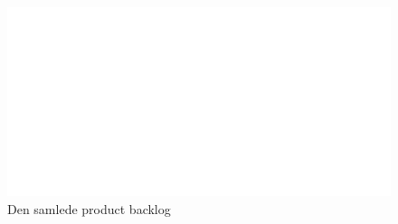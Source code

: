 \documentclass[12pt, a4paper]{report}
\begin{document}
\begin{figure}[ht]
\includegraphics[width=\textwidth]{backlog}
\caption{Den samlede product backlog}
\label{backlog}
\end{figure}

\FloatBarrier
\newpage
\mbox{}
\end{document}

